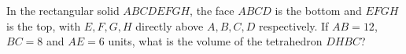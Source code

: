 In the rectangular solid $ABCDEFGH$, the face $ABCD$ is the bottom and $EFGH$ is the top, with $E,F,G,H$ directly above $A,B,C,D$ respectively. If $AB=12$, $BC=8$ and $AE=6$ units, what is the volume of the tetrahedron $DHBC$?
